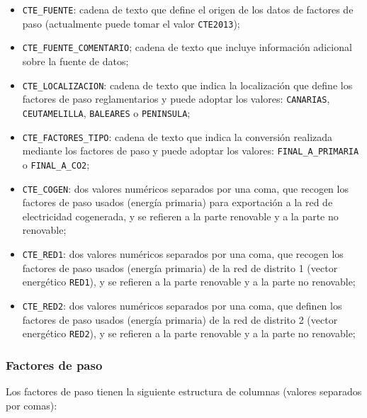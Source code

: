 \documentclass[10pt,notitlepage,oneside,a4paper]{article}
\begin{document}
\begin{itemize}
\item \texttt{CTE\_FUENTE}: cadena de texto que define el origen de los datos de factores de paso (actualmente puede tomar el valor \texttt{CTE2013});
\item \texttt{CTE\_FUENTE\_COMENTARIO}; cadena de texto que incluye información adicional sobre la fuente de datos;
\item \texttt{CTE\_LOCALIZACION}: cadena de texto que indica la localización que define los factores de paso reglamentarios y puede adoptar los valores: \texttt{CANARIAS}, \texttt{CEUTAMELILLA}, \texttt{BALEARES} o \texttt{PENINSULA};
\item \texttt{CTE\_FACTORES\_TIPO}: cadena de texto que indica la conversión realizada mediante los factores de paso y puede adoptar los valores: \texttt{FINAL\_A\_PRIMARIA} o \texttt{FINAL\_A\_CO2};
\item \texttt{CTE\_COGEN}: dos valores numéricos separados por una coma, que recogen los factores de paso usados (energía primaria) para exportación a la red de electricidad cogenerada, y se refieren a la parte renovable y a la parte no renovable;
\item \texttt{CTE\_RED1}: dos valores numéricos separados por una coma, que recogen los factores de paso usados (energía primaria) de la red de distrito 1 (vector energético \texttt{RED1}), y se refieren a la parte renovable y a la parte no renovable;
\item \texttt{CTE\_RED2}: dos valores numéricos separados por una coma, que definen los factores de paso usados (energía primaria) de la red de distrito 2 (vector energético \texttt{RED2}), y se refieren a la parte renovable y a la parte no renovable;
\end{itemize}

\subsubsection{Factores de paso}

Los factores de paso tienen la siguiente estructura de columnas (valores separados por comas):
\end{document}
